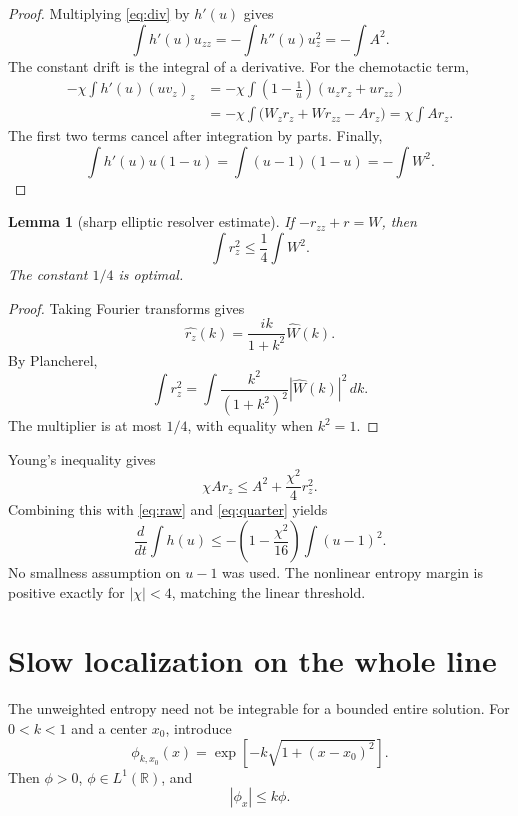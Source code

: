 \documentclass[11pt]{article}
\newcommand{\R}{\mathbb{R}}
\newcommand{\abs}[1]{\left\lvert #1\right\rvert}
\newtheorem{lemma}{Lemma}
\begin{document}
\begin{proof}
Multiplying \eqref{eq:div} by \(h'(u)\) gives
\[
 \int h'(u)u_{zz}=-\int h''(u)u_z^2=-\int A^2.
\]
The constant drift is the integral of a derivative.  For the chemotactic
term,
\begin{align*}
 -\chi\int h'(u)(uv_z)_z
 &= -\chi\int\left(1-\frac1u\right)
       (u_zr_z+ur_{zz})\\
 &= -\chi\int\bigl(W_zr_z+Wr_{zz}-Ar_z\bigr)
  =\chi\int Ar_z.
\end{align*}
The first two terms cancel after integration by parts.  Finally,
\[
 \int h'(u)u(1-u)=\int (u-1)(1-u)=-\int W^2.
\]
\end{proof}

\begin{lemma}[sharp elliptic resolver estimate]
If \(-r_{zz}+r=W\), then
\begin{equation}
 \int r_z^2\le\frac14\int W^2.                         \label{eq:quarter}
\end{equation}
The constant \(1/4\) is optimal.
\end{lemma}

\begin{proof}
Taking Fourier transforms gives
\[
 \widehat{r_z}(k)=\frac{ik}{1+k^2}\widehat W(k).
\]
By Plancherel,
\[
 \int r_z^2
 =\int\frac{k^2}{(1+k^2)^2}\abs{\widehat W(k)}^2\,dk.
\]
The multiplier is at most \(1/4\), with equality when \(k^2=1\).
\end{proof}

Young's inequality gives
\[
 \chi Ar_z\le A^2+\frac{\chi^2}{4}r_z^2.
\]
Combining this with \eqref{eq:raw} and \eqref{eq:quarter} yields
\begin{equation}
 \frac{d}{dt}\int h(u)
 \le-\left(1-\frac{\chi^2}{16}\right)\int(u-1)^2.
                                                               \label{eq:sharp}
\end{equation}
No smallness assumption on \(u-1\) was used.  The nonlinear entropy margin
is positive exactly for \(\abs\chi<4\), matching the linear threshold.

\section{Slow localization on the whole line}

The unweighted entropy need not be integrable for a bounded entire solution.
For \(0<k<1\) and a center \(x_0\), introduce
\begin{equation}
 \phi_{k,x_0}(x)
 =\exp\!\left[-k\sqrt{1+(x-x_0)^2}\right].             \label{eq:weight}
\end{equation}
Then \(\phi>0\), \(\phi\in L^1(\R)\), and
\[
 \abs{\phi_x}\le k\phi.
\]
\end{document}
